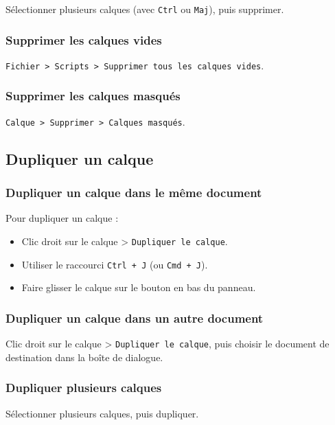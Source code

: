 Sélectionner plusieurs calques (avec \texttt{Ctrl} ou \texttt{Maj}), puis supprimer.

\subsubsection{Supprimer les calques vides}

\texttt{Fichier > Scripts > Supprimer tous les calques vides}.

\subsubsection{Supprimer les calques masqués}

\texttt{Calque > Supprimer > Calques masqués}.

\subsection{Dupliquer un calque}

\subsubsection{Dupliquer un calque dans le même document}

Pour dupliquer un calque :

\begin{itemize}
    \item Clic droit sur le calque > \texttt{Dupliquer le calque}.
    \item Utiliser le raccourci \texttt{Ctrl + J} (ou \texttt{Cmd + J}).
    \item Faire glisser le calque sur le bouton  en bas du panneau.
\end{itemize}

\subsubsection{Dupliquer un calque dans un autre document}

Clic droit sur le calque > \texttt{Dupliquer le calque}, puis choisir le document de destination dans la boîte de dialogue.

\subsubsection{Dupliquer plusieurs calques}

Sélectionner plusieurs calques, puis dupliquer.

